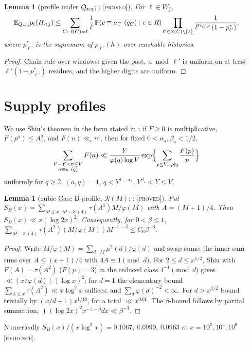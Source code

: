 \documentclass[10pt,reqno]{amsart}
\newtheorem{lemma}[theorem]{Lemma}
\theoremstyle{definition}
\theoremstyle{remark}
\newcommand{\cR}{\mathscr R}
\newcommand{\E}{\mathbb E}
\newcommand{\Prob}{\mathbb P}
\newcommand{\Qseq}{Q_{\rm seq}}
\newcommand{\lab}[1]{\textup{[\textsc{#1}]}}
\begin{document}
\begin{lemma}[profile under $\Qseq$; {\cite[Lemma~2.8]{ET}}; \lab{proved}]\label{lem:seqprofile}
For $\ell\in W_j$,
\[
 \E_{\Qseq}p_\ell(H_{<j})\leq\sum_{C:\ \ell(C)=\ell}\frac1\ell\,
 \Prob(c\equiv a_C\ (q_C)\mid c\in R)
 \prod_{\ell'\in S(C)\setminus\{\ell\}}\frac1{\ell'^{e_{C,\ell'}}(1-p^*_{\ell'})},
\]
where $p^*_{\ell'}$ is the supremum of $p_{\ell'}(h)$ over reachable
histories.
\end{lemma}
\begin{proof}
Chain rule over windows: given the past, $n\bmod\ell'$ is uniform on at
least $\ell'(1-p^*_{\ell'})$ residues, and the higher digits are uniform.
\end{proof}

\section{Supply profiles}\label{sec:profiles}

We use Shiu's theorem \cite[Theorem~1]{Shiu} in the form stated in
\cite[\S3]{TQ}: if $F\geq0$ is multiplicative, $F(p^a)\leq A_1^a$, and
$F(n)\ll_\epsilon n^\epsilon$, then for fixed $0<\alpha_s,\beta_s<1/2$,
\[
 \sum_{\substack{V-Y<n\leq V\\ n\equiv a\ (q)}}F(n)\ll\frac{Y}{\varphi(q)\log V}
 \exp\Bigl\{\sum_{p\leq V,\ p\nmid q}\frac{F(p)}p\Bigr\}
\]
uniformly for $q\geq2$, $(a,q)=1$, $q<Y^{1-\alpha_s}$, $V^{\beta_s}<Y\leq V$.

\begin{lemma}[cubic Case-B profile, $\cR(M)$; {\cite[Lemma~3.1]{ET}}; \lab{proved}]\label{lem:profileB}
Put $S_B(x)=\sum_{M\leq x,\ M\equiv3\ (4)}\tau(A^2)M/\varphi(M)$ with
$A=(M+1)/4$.  Then $S_B(x)\ll x(\log2x)^2$.  Consequently, for
$0<\beta\leq1$,
$\sum_{M\equiv3\ (4)}\tau(A^2)(M/\varphi(M))M^{-1-\beta}\leq C_6\beta^{-3}$.
\end{lemma}
\begin{proof}
Write $M/\varphi(M)=\sum_{d\mid M}\mu^2(d)/\varphi(d)$ and swap sums; the
inner sum runs over $A\leq(x+1)/4$ with $4A\equiv1\pmod d$.  For
$2\leq d\leq x^{1/2}$, Shiu with $F(A)=\tau(A^2)$ ($F(p)=3$) in the reduced
class $4^{-1}\pmod d$ gives $\ll(x/\varphi(d))(\log x)^2$; for $d=1$ the
elementary bound $\sum_{A\leq x}\tau(A^2)\ll x\log^2x$ suffices; and
$\sum_d\varphi(d)^{-2}<\infty$.  For $d>x^{1/2}$ bound trivially by
$(x/d+1)x^{1/10}$, for a total $\ll x^{0.61}$.  The $\beta$-bound follows
by partial summation, $\int(\log2x)^2x^{-1-\beta}dx\ll\beta^{-3}$.
\end{proof}
Numerically $S_B(x)/(x\log^2x)=0.1067,\ 0.0990,\ 0.0963$ at
$x=10^2,10^4,10^6$ \lab{evidence}.
\end{document}
